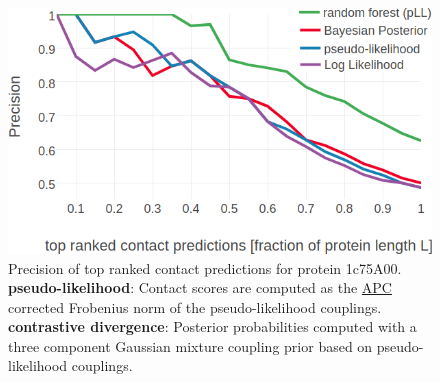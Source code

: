 \documentclass[11pt,a4paper,twoside]{book}
\theoremstyle{definition}
\theoremstyle{definition}
\theoremstyle{remark}
\begin{document}
\begin{figure}

{\centering \includegraphics[width=0.9\linewidth]{img/bayesian_model/contact_maps/1c75A00/1c75A00_precision_vs_rank_8seqsep_8contacthr} 

}

\caption{Precision of top ranked contact
predictions for protein 1c75A00. \textbf{pseudo-likelihood}: Contact
scores are computed as the \protect\hyperlink{abbrev}{APC} corrected
Frobenius norm of the pseudo-likelihood couplings. \textbf{contrastive
divergence}: Posterior probabilities computed with a three component
Gaussian mixture coupling prior based on pseudo-likelihood couplings.}\label{fig:precision-bayesian-1c75a00}
\end{figure}
\end{document}
